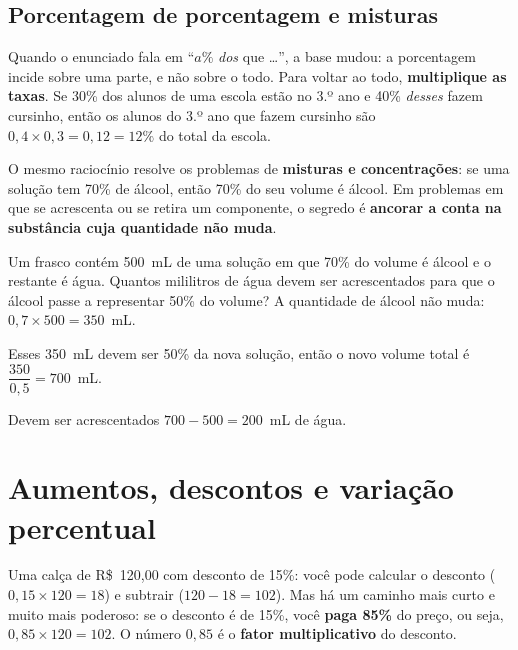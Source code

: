 \subsection{Porcentagem de porcentagem e misturas}

Quando o enunciado fala em ``$a\%$ \emph{dos} que \ldots{}'', a base mudou: a
porcentagem incide sobre uma parte, e não sobre o todo. Para voltar ao todo,
\textbf{multiplique as taxas}. Se 30\% dos alunos de uma escola estão no 3.º ano
e 40\% \emph{desses} fazem cursinho, então os alunos do 3.º ano que fazem
cursinho são $0{,}4\times 0{,}3 = 0{,}12 = 12\%$ do total da escola.

O mesmo raciocínio resolve os problemas de \textbf{misturas e concentrações}:
se uma solução tem 70\% de álcool, então 70\% do seu volume é álcool. Em
problemas em que se acrescenta ou se retira um componente, o segredo é
\textbf{ancorar a conta na substância cuja quantidade não muda}.

\begin{exemplo}
Um frasco contém 500~mL de uma solução em que 70\% do volume é álcool e o
restante é água. Quantos mililitros de água devem ser acrescentados para que o
álcool passe a representar 50\% do volume?
\solucao
{} A quantidade de álcool não muda: $0{,}7\times 500 = 350$~mL.

 Esses 350~mL devem ser 50\% da nova solução, então o novo
volume total é $\dfrac{350}{0{,}5} = 700$~mL.

 Devem ser acrescentados $700 - 500 = 200$~mL de água.
\end{exemplo}

\section{Aumentos, descontos e variação percentual}

Uma calça de R\$~120,00 com desconto de 15\%: você pode calcular o desconto
($0{,}15\times 120 = 18$) e subtrair ($120-18=102$). Mas há um caminho mais curto
e muito mais poderoso: se o desconto é de 15\%, você \textbf{paga 85\%} do preço,
ou seja, $0{,}85\times 120 = 102$. O número $0{,}85$ é o \textbf{fator
multiplicativo} do desconto.

